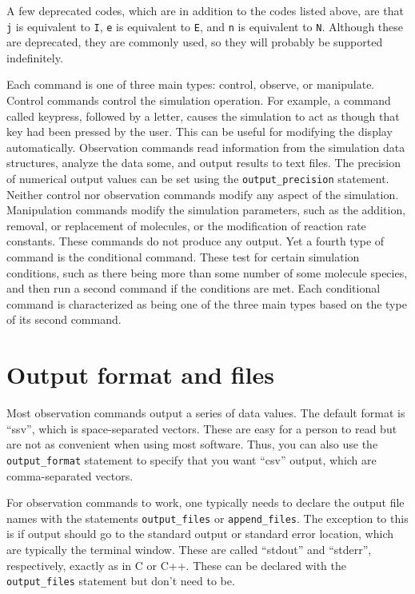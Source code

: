 \documentclass {scrbook}
\newcommand {\ttt} {\texttt}
\begin{document}
A few deprecated codes, which are in addition to the codes listed above, are that \ttt{j} is equivalent to \ttt{I}, \ttt{e} is equivalent to \ttt{E}, and \ttt{n} is equivalent to \ttt{N}. Although these are deprecated, they are commonly used, so they will probably be supported indefinitely.

Each command is one of three main types: control, observe, or manipulate. Control commands control the simulation operation. For example, a command called keypress, followed by a letter, causes the simulation to act as though that key had been pressed by the user. This can be useful for modifying the display automatically. Observation commands read information from the simulation data structures, analyze the data some, and output results to text files. The precision of numerical output values can be set using the \ttt{output\_precision} statement. Neither control nor observation commands modify any aspect of the simulation. Manipulation commands modify the simulation parameters, such as the addition, removal, or replacement of molecules, or the modification of reaction rate constants. These commands do not produce any output. Yet a fourth type of command is the conditional command. These test for certain simulation conditions, such as there being more than some number of some molecule species, and then run a second command if the conditions are met. Each conditional command is characterized as being one of the three main types based on the type of its second command.

\section{Output format and files}

Most observation commands output a series of data values. The default format is ``ssv'', which is space-separated vectors. These are easy for a person to read but are not as convenient when using most software. Thus, you can also use the \ttt{output\_format} statement to specify that you want ``csv'' output, which are comma-separated vectors.

For observation commands to work, one typically needs to declare the output file names with the statements \ttt{output\_files} or \ttt{append\_files}. The exception to this is if output should go to the standard output or standard error location, which are typically the terminal window. These are called ``stdout'' and ``stderr'', respectively, exactly as in C or C++. These can be declared with the \ttt{output\_files} statement but don't need to be.
\end{document}
